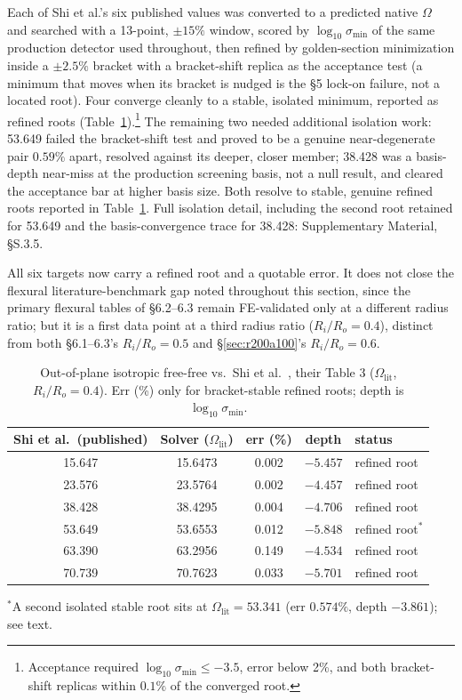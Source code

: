 \documentclass[11pt]{article}
\begin{document}
Each of Shi et al.'s six published values was converted to a predicted
native $\Omega$ and searched with a 13-point, $\pm15\%$ window, scored by
$\log_{10}\sigma_{\min}$ of the same production detector used throughout,
then refined by golden-section minimization inside a $\pm2.5\%$ bracket
with a bracket-shift replica as the acceptance test (a minimum that moves
when its bracket is nudged is the \S5 lock-on failure, not a located
root). Four converge cleanly to a stable, isolated minimum, reported as
refined roots (Table~\ref{tab:shi2014oop}).\footnote{Acceptance required
$\log_{10}\sigma_{\min}\le-3.5$, error below 2\%, and both bracket-shift
replicas within $0.1\%$ of the converged root.} The remaining two needed
additional isolation work: 53.649 failed the bracket-shift test and
proved to be a genuine near-degenerate pair $0.59\%$ apart, resolved
against its deeper, closer member; 38.428 was a basis-depth near-miss at
the production screening basis, not a null result, and cleared the
acceptance bar at higher basis size. Both resolve to stable, genuine
refined roots reported in Table~\ref{tab:shi2014oop}. Full isolation
detail, including the second root retained for 53.649 and the
basis-convergence trace for 38.428: Supplementary Material, §S.3.5.

All six targets now carry a refined root and a quotable error. It does
not close the flexural literature-benchmark gap noted throughout this
section, since the primary flexural tables of \S6.2--6.3 remain
FE-validated only at a different radius ratio; but it is a first data
point at a third radius ratio ($R_i/R_o=0.4$), distinct from both
\S6.1--6.3's $R_i/R_o=0.5$ and \S\ref{sec:r200a100}'s $R_i/R_o=0.6$.

\begin{table}[!htbp]\centering\footnotesize
\renewcommand{\arraystretch}{0.92}
\caption{Out-of-plane isotropic free-free vs.\ Shi et al.\
\cite{shi2014sector}, their Table 3 ($\Omega_{\mathrm{lit}}$,
$R_i/R_o=0.4$). Err (\%) only for bracket-stable refined roots; depth is
$\log_{10}\sigma_{\min}$.}
\label{tab:shi2014oop}
\begin{tabular}{ccccl}
\toprule Shi et al.\ (published) & Solver ($\Omega_{\mathrm{lit}}$) & err (\%) & depth & status\\ \midrule
15.647 & 15.6473 & 0.002 & $-5.457$ & refined root\\
23.576 & 23.5764 & 0.002 & $-4.457$ & refined root\\
38.428 & 38.4295 & 0.004 & $-4.706$ & refined root\\
53.649 & 53.6553 & 0.012 & $-5.848$ & refined root$^{\ast}$\\
63.390 & 63.2956 & 0.149 & $-4.534$ & refined root\\
70.739 & 70.7623 & 0.033 & $-5.701$ & refined root\\
\bottomrule
\end{tabular}

\renewcommand{\arraystretch}{1}
{\footnotesize $^\ast$A second isolated stable root sits at
$\Omega_{\mathrm{lit}}=53.341$ (err $0.574\%$, depth $-3.861$); see
text.}
\end{table}
\end{document}
